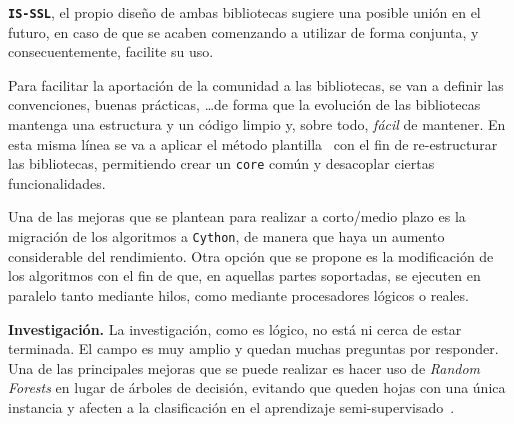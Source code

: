 \textbf{\texttt{IS-SSL}}, el propio diseño de ambas bibliotecas sugiere una posible unión en el futuro, en caso de que se acaben comenzando a utilizar de forma conjunta, y consecuentemente, facilite su uso. 

Para facilitar la aportación de la comunidad a las bibliotecas, se van a definir las convenciones, buenas prácticas, \ldots de forma que la evolución de las bibliotecas mantenga una estructura y un código limpio y, sobre todo, \emph{fácil} de mantener. En esta misma línea se va a aplicar el método plantilla~\cite{shvets2021} con el fin de re-estructurar las bibliotecas, permitiendo crear un \texttt{core} común y desacoplar ciertas funcionalidades.

Una de las mejoras que se plantean para realizar a corto/medio plazo es la migración de los algoritmos a \texttt{Cython}, de manera que haya un aumento considerable del rendimiento. Otra opción que se propone es la modificación de los algoritmos con el fin de que, en aquellas partes soportadas, se ejecuten en paralelo tanto mediante hilos, como mediante procesadores lógicos o reales.

\textbf{Investigación.} La investigación, como es lógico, no está ni cerca de estar terminada. El campo es muy amplio y quedan muchas preguntas por responder. Una de las principales mejoras que se puede realizar es hacer uso de \textit{Random Forests} en lugar de árboles de decisión, evitando que queden hojas con una única instancia y afecten a la clasificación en el aprendizaje semi-supervisado~\cite{tanha2017semi}.

